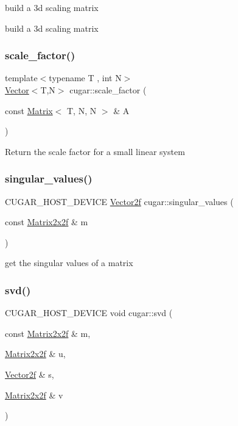build a 3d scaling matrix 

build a 3d scaling matrix \mbox{\label{group___matrices_module_ga342b4467e7b63d9df5aa3697d7fd8abf}} 
\subsubsection{\texorpdfstring{scale\+\_\+factor()}{scale\_factor()}}
{\footnotesize\ttfamily template$<$typename T , int N$>$ \\
\hyperlink{structcugar_1_1_vector}{Vector}$<$T,N$>$ cugar\+::scale\+\_\+factor (\begin{DoxyParamCaption}\item[{const \hyperlink{structcugar_1_1_matrix}{Matrix}$<$ T, N, N $>$ \&}]{A }\end{DoxyParamCaption})}

Return the scale factor for a small linear system \mbox{\label{group___matrices_module_gaa1e73bc6264dda2d9b49c2f172565382}} 
\subsubsection{\texorpdfstring{singular\+\_\+values()}{singular\_values()}}
{\footnotesize\ttfamily C\+U\+G\+A\+R\+\_\+\+H\+O\+S\+T\+\_\+\+D\+E\+V\+I\+CE \hyperlink{structcugar_1_1_vector}{Vector2f} cugar\+::singular\+\_\+values (\begin{DoxyParamCaption}\item[{const \hyperlink{structcugar_1_1_matrix}{Matrix2x2f} \&}]{m }\end{DoxyParamCaption})\hspace{0.3cm}{\ttfamily [inline]}}

get the singular values of a matrix \mbox{\label{group___matrices_module_gab83521723618b3ffc4eb605cc2e0580f}} 
\subsubsection{\texorpdfstring{svd()}{svd()}}
{\footnotesize\ttfamily C\+U\+G\+A\+R\+\_\+\+H\+O\+S\+T\+\_\+\+D\+E\+V\+I\+CE void cugar\+::svd (\begin{DoxyParamCaption}\item[{const \hyperlink{structcugar_1_1_matrix}{Matrix2x2f} \&}]{m,  }\item[{\hyperlink{structcugar_1_1_matrix}{Matrix2x2f} \&}]{u,  }\item[{\hyperlink{structcugar_1_1_vector}{Vector2f} \&}]{s,  }\item[{\hyperlink{structcugar_1_1_matrix}{Matrix2x2f} \&}]{v }\end{DoxyParamCaption})\hspace{0.3cm}{\ttfamily [inline]}}

